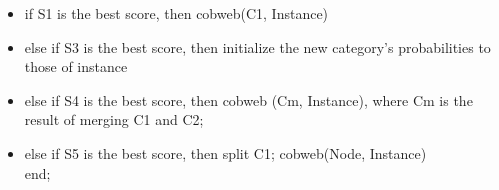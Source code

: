 \begin{itemize}
    \item if S1 is the best score, then cobweb(C1, Instance)\\
    \item else if S3 is the best score, then initialize the new category’s probabilities to those of instance\\
    \item else if S4 is the best score, then cobweb (Cm, Instance), where Cm is the result of merging C1 and C2;\\
    \item  else if S5 is the best score, then split C1; cobweb(Node, Instance)\\
    end;
    \end{itemize}